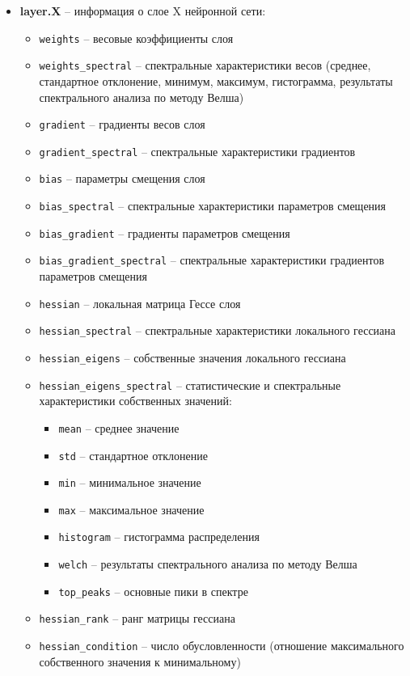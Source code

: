 \documentclass[a4paper,12pt]{article}
\begin{document}
\begin{itemize}
  \item \textbf{layer.X} -- информация о слое X нейронной сети:
    \begin{itemize}
      \item \texttt{weights} -- весовые коэффициенты слоя
      \item \texttt{weights\_spectral} -- спектральные характеристики весов (среднее, стандартное отклонение,
        минимум, максимум, гистограмма, результаты спектрального анализа по методу Велша)
      \item \texttt{gradient} -- градиенты весов слоя
      \item \texttt{gradient\_spectral} -- спектральные характеристики градиентов
      \item \texttt{bias} -- параметры смещения слоя
      \item \texttt{bias\_spectral} -- спектральные характеристики параметров смещения
      \item \texttt{bias\_gradient} -- градиенты параметров смещения
      \item \texttt{bias\_gradient\_spectral} -- спектральные характеристики градиентов параметров смещения
      \item \texttt{hessian} -- локальная матрица Гессе слоя
      \item \texttt{hessian\_spectral} -- спектральные характеристики локального гессиана
      \item \texttt{hessian\_eigens} -- собственные значения локального гессиана
      \item \texttt{hessian\_eigens\_spectral} -- статистические и спектральные характеристики собственных значений:
        \begin{itemize}
          \item \texttt{mean} -- среднее значение
          \item \texttt{std} -- стандартное отклонение
          \item \texttt{min} -- минимальное значение
          \item \texttt{max} -- максимальное значение
          \item \texttt{histogram} -- гистограмма распределения
          \item \texttt{welch} -- результаты спектрального анализа по методу Велша
          \item \texttt{top\_peaks} -- основные пики в спектре
        \end{itemize}
      \item \texttt{hessian\_rank} -- ранг матрицы гессиана
      \item \texttt{hessian\_condition} -- число обусловленности (отношение максимального собственного
        значения к минимальному)
    \end{itemize}


\end{itemize}
\end{document}
